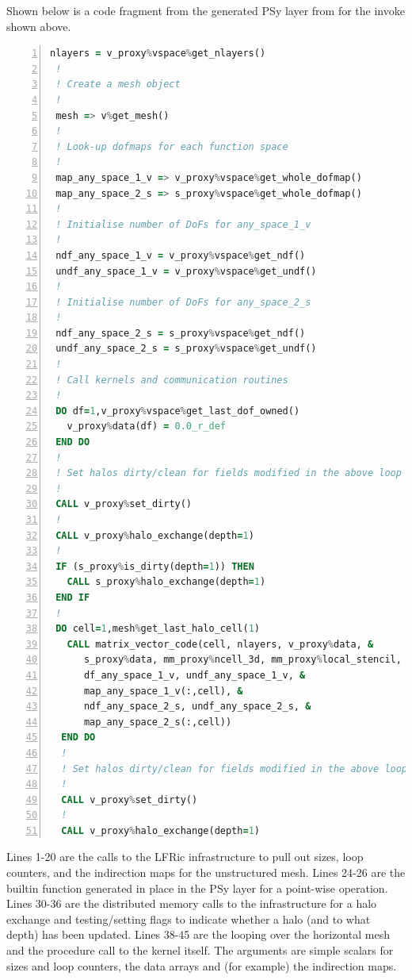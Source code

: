 \documentclass[times]{elsarticle}
\begin{document}
Shown below is a code fragment from the generated PSy layer from for
the invoke shown above.
\begin{lstlisting}[language=Fortran, numbers=left]
 nlayers = v_proxy%vspace%get_nlayers()
 !
 ! Create a mesh object
 !
 mesh => v%get_mesh()
 !
 ! Look-up dofmaps for each function space
 !
 map_any_space_1_v => v_proxy%vspace%get_whole_dofmap()
 map_any_space_2_s => s_proxy%vspace%get_whole_dofmap()
 !
 ! Initialise number of DoFs for any_space_1_v
 !
 ndf_any_space_1_v = v_proxy%vspace%get_ndf()
 undf_any_space_1_v = v_proxy%vspace%get_undf()
 !
 ! Initialise number of DoFs for any_space_2_s
 !
 ndf_any_space_2_s = s_proxy%vspace%get_ndf()
 undf_any_space_2_s = s_proxy%vspace%get_undf()
 !
 ! Call kernels and communication routines
 !
 DO df=1,v_proxy%vspace%get_last_dof_owned()
   v_proxy%data(df) = 0.0_r_def
 END DO 
 !
 ! Set halos dirty/clean for fields modified in the above loop
 !
 CALL v_proxy%set_dirty()
 !
 CALL v_proxy%halo_exchange(depth=1)
 !
 IF (s_proxy%is_dirty(depth=1)) THEN
   CALL s_proxy%halo_exchange(depth=1)
 END IF 
 !
 DO cell=1,mesh%get_last_halo_cell(1)
   CALL matrix_vector_code(cell, nlayers, v_proxy%data, &
      s_proxy%data, mm_proxy%ncell_3d, mm_proxy%local_stencil, &
      df_any_space_1_v, undf_any_space_1_v, &
      map_any_space_1_v(:,cell), &
      ndf_any_space_2_s, undf_any_space_2_s, &
      map_any_space_2_s(:,cell))
  END DO 
  !
  ! Set halos dirty/clean for fields modified in the above loop
  !
  CALL v_proxy%set_dirty()
  !
  CALL v_proxy%halo_exchange(depth=1)
\end{lstlisting}
Lines 1-20 are the calls to the LFRic infrastructure to pull out
sizes, loop counters, and the indirection maps for the unstructured
mesh. Lines 24-26 are the builtin function generated in place in the
PSy layer for a point-wise operation. Lines 30-36 are the distributed
memory calls to the infrastructure for a halo exchange and
testing/setting flags to indicate whether a halo (and to what depth)
has been updated. Lines 38-45 are the looping over the horizontal mesh
and the procedure call to the kernel itself. The arguments are simple
scalars for sizes and loop counters, the data arrays and (for example)
the indirection maps. 
\end{document}

